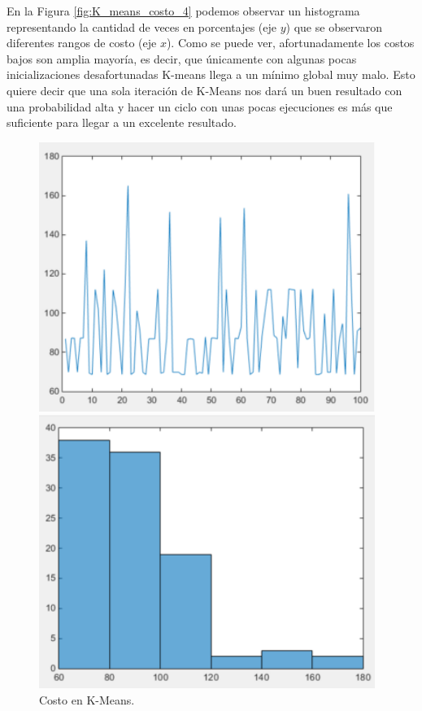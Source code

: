\documentclass[12pt,a4paper]{article}
\begin{document}
\begin{sloppypar}
En la Figura \ref{fig:K_means_costo_4} podemos observar un histograma representando la cantidad de veces en porcentajes (eje $y$) que se observaron diferentes rangos de costo (eje $x$). Como se puede ver, afortunadamente los costos bajos son amplia mayoría, es decir, que únicamente con algunas pocas inicializaciones desafortunadas K-means llega a un mínimo global muy malo. Esto quiere decir que una sola iteración de K-Means nos dará un buen resultado con una probabilidad alta y hacer un ciclo con unas pocas ejecuciones es más que suficiente para llegar a un excelente resultado.

\begin{figure}[H] %
\begin{minipage}[b]{0.5\linewidth}
\centering
\includegraphics[width=\linewidth]{images/K_means_costo_3.png}
\caption{Costo en K-Means. \cite{apunte_uba}}
\label{fig:K_means_costo_3}
\end{minipage}
\hspace{0.5cm}
\begin{minipage}[b]{0.5\linewidth}
\centering
\includegraphics[width=\linewidth]{images/K_means_costo_4.png}

\end{minipage}
\end{figure}
\end{sloppypar}
\end{document}
